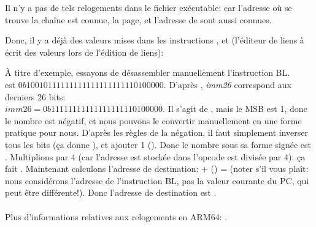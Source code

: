 Il n'y a pas de tels relogements dans le fichier exécutable: car l'adresse où se
trouve la chaîne  est connue, la page, et l'adresse de \puts sont aussi
connues.

Donc, il y a déjà des valeurs mises dans les instructions , \ADD et 
(l'éditeur de liens à écrit des valeurs lors de l'édition de liens):




À titre d'exemple, essayons de désassembler manuellement l'instruction BL.\\
 est $0b10010111111111111111111110100000$.
D'après , \emph{imm26} correspond aux derniers
26 bits:\\
$imm26 = 0b11111111111111111110100000$.
Il s'agit de , mais le \ac{MSB} est 1,
donc le nombre est négatif, et nous pouvons le convertir manuellement en une forme
pratique pour nous.
D'après les règles de la négation, il faut simplement
inverser tous les bits (ça donne ), et ajouter 1 ().
Donc le nombre sous sa forme signée est .
Multiplions  par 4 (car l'adresse est stockée dans l'opcode est divisée
par 4): ça fait .
Maintenant calculons l'adresse de destination:  + () = 
(noter s'il vous plaît: nous considérons l'adresse de l'instruction BL, pas la valeur
courante du \ac{PC}, qui peut être différente!).
Donc l'adresse de destination est .\\
\\
Plus d'informations relatives aux relogements en ARM64: \ARMELF.
